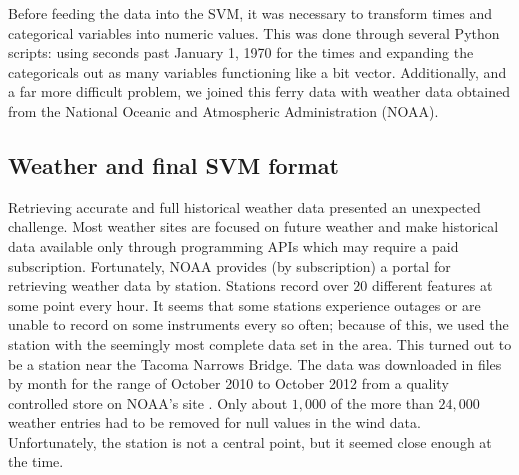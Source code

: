 \documentclass[11pt]{article} %
\begin{document}
Before feeding the data into the SVM, it was necessary to transform times and 
categorical variables into numeric values. This was done through several Python
scripts: using seconds past January 1, 1970 for the times and expanding the 
categoricals out as many variables functioning like a bit vector. Additionally,
and a far more difficult problem, we joined this ferry data with weather data
obtained from the National Oceanic and Atmospheric Administration (NOAA).

% 
% 

\subsection{Weather and final SVM format}
\label{sec:data_origins}
Retrieving accurate and full historical weather data presented an unexpected 
challenge. Most weather sites are focused on future weather and make historical
data available only through programming APIs which may require a paid subscription.
Fortunately, NOAA provides (by subscription) a portal for retrieving weather data
by station. Stations record over $20$ different features at some point every hour.
It seems that some stations experience outages or are unable to record on some
instruments every so often; because of this, we used the station with the seemingly
most complete data set in the area. This turned out to be a station near the 
Tacoma Narrows Bridge. The data was downloaded in files by month for the range of
October 2010 to October 2012 from a quality controlled store on NOAA's 
site \cite{noaaWeather}. Only about $1,000$ of the more than $24,000$ weather 
entries had to be removed for null values in the wind data.  Unfortunately, 
the station is not a central point, but it seemed close enough at the time. 
\end{document}
